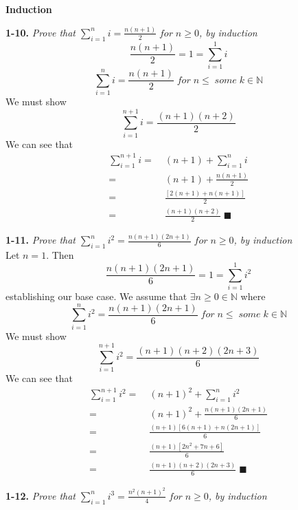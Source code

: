 \textbf{Induction}

\textbf{1-10.} \emph{Prove that $\sum_{i=1}^{n}i=\frac{n(n+1)}{2} \;for\; n \geq 0$, by induction} \\
$$\frac{n(n+1)}{2} = 1 = \sum_{i=1}^{1} i$$
$$\sum_{i=1}^{n} i = \frac{n(n+1)}{2} \;for\; n \leq \;some\; k \in \mathbb{N}$$
We must show
$$\sum_{i=1}^{n+1} i = \frac{(n+1)(n+2)}{2}$$
We can see that
\begin{align*}
\sum_{i=1}^{n+1} i =& \; (n+1) + \sum_{i=1}^{n} i \\
				   =& \; (n+1) + \frac{n(n+1)}{2} \\
				   =& \; \frac{[2(n+1) + n(n+1)]}{2} \\
				   =& \; \frac{(n+1)(n+2)}{2} \;\blacksquare
\end{align*}



\textbf{1-11.} \emph{Prove that $\sum_{i=1}^{n}i^{2}=\frac{n(n+1)(2n+1)}{6} \;for\; n \geq 0$, by induction} \\
Let $n = 1$. Then
$$\frac{n(n+1)(2n+1)}{6} = 1 = \sum_{i=1}^{1} i^{2}$$
establishing our base case. We assume that $\exists n \geq 0 \in  \mathbb{N}$ where
$$\sum_{i=1}^{n} i^{2} = \frac{n(n+1)(2n+1)}{6} \;for\; n \leq \;some\; k \in \mathbb{N}$$
We must show
$$\sum_{i=1}^{n+1}i^{2}=\frac{(n+1)(n+2)(2n+3)}{6}$$
We can see that
\begin{align*}
\sum_{i=1}^{n+1} i^{2} =& \; (n+1)^{2} + \sum_{i=1}^{n} i^2 \\
					   =& \; (n+1)^{2} + \frac{n(n+1)(2n+1)}{6} \\
					   =& \; \frac{(n+1)[6(n+1) + n(2n+1)]}{6} \\
					   =& \; \frac{(n+1)[2n^{2} + 7n + 6]}{6} \\
					   =& \; \frac{(n+1)(n+2)(2n+3)}{6} \;\blacksquare
\end{align*}


\textbf{1-12.} \emph{Prove that $\sum_{i=1}^{n}i^{3}=\frac{n^{2}(n+1)^{2}}{4} \;for\; n \geq 0$, by induction}  \\

